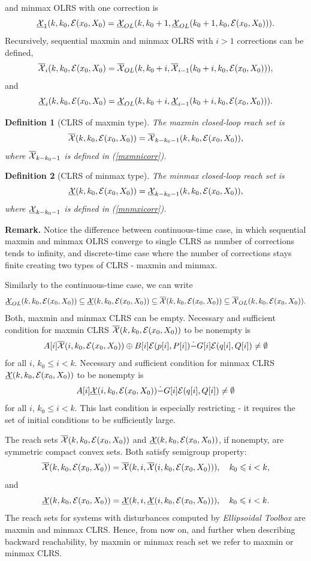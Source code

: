 \documentclass{report}
\newtheorem{df}{Definition}[section]
\newcommand{\bd}{\begin{df}}
\newcommand{\ed}{\end{df}}
\newcommand{\EE}{{\cal E}}
\newcommand{\XX}{{\cal X}}
\begin{document}
and minmax OLRS with one correction is
\[ \underline{\XX}_1(k,k_0,\EE(x_0,X_0) =
\underline{\XX}_{OL}(k,k_0+1,\underline{\XX}_{OL}(k_0+1,k_0,\EE(x_0,X_0))). \]
Recursively, sequential maxmin and minmax OLRS with $i>1$ corrections
can be defined,
\begin{equation}
\overline{\XX}_i(k,k_0,\EE(x_0,X_0) =
\overline{\XX}_{OL}(k,k_0+i,\overline{\XX}_{i-1}(k_0+i,k_0,\EE(x_0,X_0))),
\label{mxmnicorr}
\end{equation}
and
\begin{equation}
\underline{\XX}_i(k,k_0,\EE(x_0,X_0) =
\underline{\XX}_{OL}(k,k_0+i,\underline{\XX}_{i-1}(k_0+i,k_0,\EE(x_0,X_0))).
\label{mnmxicorr}
\end{equation}
\bd[CLRS of maxmin type]
The maxmin closed-loop reach set is
\[ \overline{\XX}(k,k_0,\EE(x_0,X_0)) =
\overline{\XX}_{k-k_0-1}(k,k_0,\EE(x_0,X_0)) , \]
where $\overline{\XX}_{k-k_0-1}$ is defined in (\ref{mxmnicorr}).
\ed
\bd[CLRS of minmax type]
The minmax closed-loop reach set is
\[ \underline{\XX}(k,k_0,\EE(x_0,X_0)) =
\underline{\XX}_{k-k_0-1}(k,k_0,\EE(x_0,X_0)) , \]
where $\underline{\XX}_{k-k_0-1}$ is defined in (\ref{mnmxicorr}).
\ed

{\bf Remark.} Notice the difference between continuous-time case, in which
sequential maxmin and minmax OLRS converge to single CLRS as number of
corrections tends to infinity, and discrete-time case where the number of
corrections stays finite creating two types of CLRS - maxmin and minmax.

Similarly to the continuous-time case, we can write
\[ \underline{\XX}_{OL}(k,k_0,\EE(x_0,X_0)) \subseteq
\underline{\XX}(k,k_0,\EE(x_0,X_0)) \subseteq
\overline{\XX}(k,k_0,\EE(x_0,X_0)) \subseteq
\overline{\XX}_{OL}(k,k_0,\EE(x_0,X_0)) .  \]
Both, maxmin and minmax CLRS can be empty. Necessary and sufficient condition
for maxmin CLRS $\overline{\XX}(k,k_0,\EE(x_0,X_0))$ to be nonempty is
\[ A[i]\overline{\XX}(i,k_0,\EE(x_0,X_0)) \oplus B[i]\EE(p[i],P[i])
\dot{-} G[i]\EE(q[i],Q[i]) \neq \emptyset \]
for all $i$, $k_0\leq i<k$. Necessary and sufficient condition
for minmax CLRS $\underline{\XX}(k,k_0,\EE(x_0,X_0))$ to be nonempty is
\[ A[i]\underline{\XX}(i,k_0,\EE(x_0,X_0))
\dot{-} G[i]\EE(q[i],Q[i]) \neq \emptyset \]
for all $i$, $k_0\leq i<k$. This last condition is especially restricting -
it requires the set of initial conditions to be sufficiently large.

The reach sets $\overline{\XX}(k,k_0,\EE(x_0,X_0))$ and
$\underline{\XX}(k,k_0,\EE(x_0,X_0))$, if nonempty,
are symmetric compact convex sets.
Both satisfy semigroup property:
\[ \overline{\XX}(k,k_0,\EE(x_0,X_0)) =
 \overline{\XX}(k,i,\overline{\XX}(i,k_0,\EE(x_0,X_0))) ,
~~~ k_0\leq i<k,\]
and
\[ \underline{\XX}(k,k_0,\EE(x_0,X_0)) =
 \underline{\XX}(k,i,\underline{\XX}(i,k_0,\EE(x_0,X_0))) ,
~~~ k_0\leq i<k.\]
The reach sets for systems with disturbances computed by
{\it Ellipsoidal Toolbox} are maxmin and minmax CLRS.
Hence, from now on, and further when describing backward reachability,
by maxmin or minmax reach set we refer to maxmin or minmax CLRS.
\end{document}
